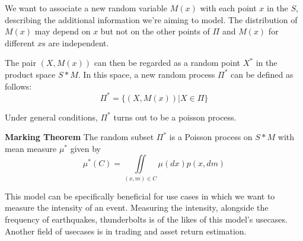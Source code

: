 \documentclass{article}
\begin{document}
    We want to associate a new random variable $M(x)$ with each point $x$ in the $S$, describing the additional information we're aiming to model. The distribution of $M(x)$ may depend on $x$ but not on the other points of $\Pi$ and $M(x)$ for different $x$s are independent.
    
    The pair $(X, M(x))$ can then be regarded as a random point $X^*$ in the product space $S * M$. In this space, a new random process $\Pi^*$ can be defined as follows:
    $$ \Pi^* = \{(X, M(x)) | X \in \Pi \} $$
    
    Under general conditions, $\Pi^*$ turns out to be a poisson process.
    
    \textbf{Marking Theorem} The random subset $\Pi^*$ is a Poisson process on $S * M$ with mean measure $\mu^*$ given by 
    $$ \mu^*(C) = \iint\limits_{(x,m) \in C}{\mu(dx)p(x, dm)}$$
    
    This model can be specifically beneficial for use cases in which we want to measure the intensity of an event. Measuring the intensity, alongside the frequency of earthquakes, thunderbolts is of the likes of this model's usecases. Another field of usecases is in trading and asset return estimation. 
\end{document}
